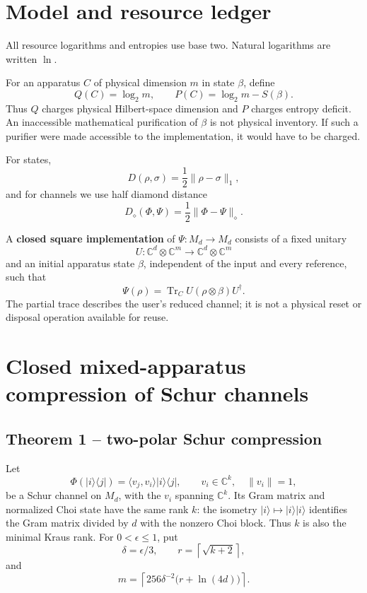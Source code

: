 \documentclass[11pt,a4paper]{article}
\numberwithin{equation}{section}
\begin{document}
\section{Model and resource ledger}\label{model-and-resource-ledger}

All resource logarithms and entropies use base two. Natural logarithms
are written \(\ln\).

For an apparatus \(C\) of physical dimension \(m\) in state \(\beta\),
define \[
Q(C)=\log_2m,\qquad
P(C)=\log_2m-S(\beta).
\] Thus \(Q\) charges physical Hilbert-space dimension and \(P\) charges
entropy deficit. An inaccessible mathematical purification of \(\beta\)
is not physical inventory. If such a purifier were made accessible to
the implementation, it would have to be charged.

For states, \[
D(\rho,\sigma)=\frac12\|\rho-\sigma\|_1,
\] and for channels we use half diamond distance \[
D_\diamond(\Phi,\Psi)=\frac12\|\Phi-\Psi\|_\diamond.
\]

A \textbf{closed square implementation} of \(\Psi:M_d\to M_d\) consists
of a fixed unitary \[
U:\mathbb C^d\otimes\mathbb C^m
\longrightarrow
\mathbb C^d\otimes\mathbb C^m
\] and an initial apparatus state \(\beta\), independent of the input
and every reference, such that \[
\Psi(\rho)=\operatorname{Tr}_C U(\rho\otimes\beta)U^\dagger.
\] The partial trace describes the user's reduced channel; it is not a
physical reset or disposal operation available for reuse.

\section{Closed mixed-apparatus compression of Schur
channels}\label{closed-mixed-apparatus-compression-of-schur-channels}

\subsection*{Theorem 1 -- two-polar Schur
compression}\label{theorem-1-two-polar-schur-compression}

Let \[
\Phi(|i\rangle\langle j|)
  =\langle v_j,v_i\rangle |i\rangle\langle j|,
\qquad
v_i\in\mathbb C^k,\quad \|v_i\|=1,
\] be a Schur channel on \(M_d\), with the \(v_i\) spanning
\(\mathbb C^k\). Its Gram matrix and normalized Choi state have the same
rank \(k\): the isometry \(|i\rangle\mapsto|i\rangle|i\rangle\)
identifies the Gram matrix divided by \(d\) with the nonzero Choi block.
Thus \(k\) is also the minimal Kraus rank. For \(0<\epsilon\le1\), put
\[
\delta=\epsilon/3,
\qquad
r=\left\lceil\sqrt{k+2}\right\rceil,
\] and \[
m=
\left\lceil
256\delta^{-2}\bigl(r+\ln(4d)\bigr)
\right\rceil .
\]
\end{document}
